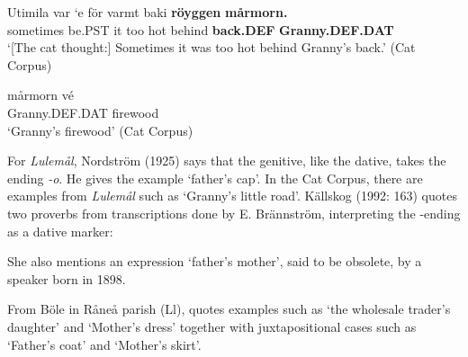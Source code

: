 
\ea\label{}
\gll Utimila  var  ‘e  för  varmt  baki  \textbf{röyggen} \textbf{mårmorn.}\\
sometimes  be.PST  it  too  hot  behind  \textbf{back.DEF} \textbf{Granny.DEF.DAT}\\
\glt ‘[The cat thought:] Sometimes it was too hot behind Granny’s back.’ (Cat Corpus)
\z

\ea\label{}
\gll mårmorn  vé\\
Granny.DEF.DAT  firewood\\
\glt ‘Granny’s firewood’  (Cat Corpus)
\z

For \textit{Lulemål}, Nordström (1925) says that the genitive, like the dative, takes the ending\textit{ {}-o}. He gives the example  ‘father’s cap’. In the Cat Corpus, there are examples from \textit{Lulemål} such as  ‘Granny’s little road’.  Källskog (1992: 163) quotes two proverbs from transcriptions done by E. Brännström, interpreting the -ending as a dative marker: 


\ea\label{}

\z 
\z

She also mentions an expression  ‘father’s mother’, said to be obsolete, by a speaker born in 1898.


From Böle in Råneå parish (Ll), \citet[113]{Wikberg2004} quotes examples such as  ‘the wholesale trader’s daughter’ and  ‘Mother’s dress’ together with juxtapositional cases such as  ‘Father’s coat’ and  ‘Mother’s skirt’.

